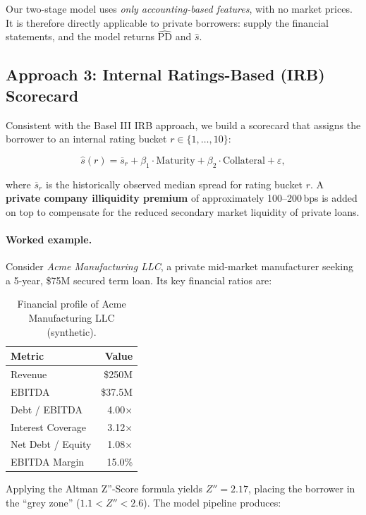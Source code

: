 \documentclass[12pt, a4paper]{article}
\theoremstyle{definition}
\begin{document}
Our two-stage model uses \emph{only accounting-based features}, with no market prices.
It is therefore directly applicable to private borrowers: supply the financial
statements, and the model returns $\widehat{\text{PD}}$ and $\hat{s}$.

\subsection{Approach 3: Internal Ratings-Based (IRB) Scorecard}

Consistent with the Basel III IRB approach, we build a scorecard that assigns the
borrower to an internal rating bucket $r \in \{1, \ldots, 10\}$:

\begin{equation}
  \hat{s}(r) = \overline{s}_r + \beta_1 \cdot \text{Maturity} + \beta_2 \cdot \text{Collateral} + \varepsilon,
\end{equation}

where $\overline{s}_r$ is the historically observed median spread for rating bucket
$r$.
A \textbf{private company illiquidity premium} of approximately 100--200\,bps is
added on top to compensate for the reduced secondary market liquidity of private
loans.

\paragraph{Worked example.}
Consider \emph{Acme Manufacturing LLC}, a private mid-market manufacturer seeking
a 5-year, \$75M secured term loan.  Its key financial ratios are:

\begin{table}[htbp]
\centering
\caption{Financial profile of Acme Manufacturing LLC (synthetic).}
\label{tab:private_borrower}
\small
\begin{tabular}{lr}
\toprule
Metric & Value \\
\midrule
Revenue           & \$250M \\
EBITDA            & \$37.5M \\
Debt / EBITDA     & 4.00$\times$ \\
Interest Coverage & 3.12$\times$ \\
Net Debt / Equity & 1.08$\times$ \\
EBITDA Margin     & 15.0\% \\
\bottomrule
\end{tabular}
\end{table}

Applying the Altman Z''-Score formula yields $Z'' = 2.17$, placing the borrower in the
``grey zone'' ($1.1 < Z'' < 2.6$).  The model pipeline produces:
\end{document}
